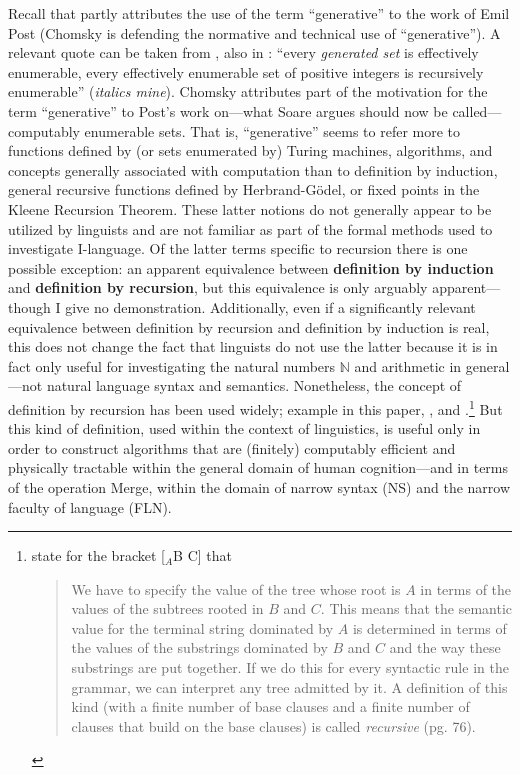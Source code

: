 \documentclass[11pt,twoside]{article}
\theoremstyle{plain}
\numberwithin{equation}{section}
\theoremstyle{definition}
\newtheorem{phrase string}{Phrase String}
\begin{document}
Recall that \cite[9]{chomsky65aspects} partly attributes the use of the term ``generative'' to the work of Emil Post (Chomsky is defending the normative and technical use of ``generative''). A relevant quote can be taken from \cite[286]{post:1944}, also in \cite{soare:2008}: ``every \textsl{generated set} is effectively enumerable, every effectively enumerable set of positive integers is recursively enumerable'' (\textsl{italics mine}). Chomsky attributes part of the motivation for the term ``generative'' to Post's work on---what Soare argues should now be called---computably enumerable sets. That is, ``generative'' seems to refer more to functions defined by (or sets enumerated by) Turing machines, algorithms, and concepts generally associated with computation than to definition by induction, general recursive functions defined by Herbrand-G\"odel, or fixed points in the Kleene Recursion Theorem. These latter notions do not generally appear to be utilized by linguists and are not familiar as part of the formal methods used to investigate I-language. Of the latter terms specific to recursion there is one possible exception: an apparent equivalence between \textbf{definition by induction} and \textbf{definition by recursion}, but this equivalence is only arguably apparent---though I give no demonstration. Additionally, even if a significantly relevant equivalence between definition by recursion and definition by induction is real, this does not change the fact that linguists do not use the latter because it is in fact only useful for investigating the natural numbers $\mathbb{N}$ and arithmetic in general---not natural language syntax and semantics. Nonetheless, the concept of definition by recursion has been used widely; example  in this paper, \cite{pmw:1990}, and \cite{chmg:2000}.\footnote{\cite{chmg:2000} state for the bracket [$_{A}$B C] that \begin{quotation} We have to specify the value of the tree whose root is $A$ in terms of the values of the subtrees rooted in $B$ and $C$. This means that the semantic value for the terminal string dominated by $A$ is determined in terms of the values of the substrings dominated by $B$ and $C$ and the way these substrings are put together. If we do this for every syntactic rule in the grammar, we can interpret any tree admitted by it. A definition of this kind (with a finite number of base clauses and a finite number of clauses that build on the base clauses) is called \textsl{recursive} (pg. 76). \end{quotation}} But this kind of definition, used within the context of linguistics, is useful only in order to construct algorithms that are (finitely) computably efficient and physically tractable within the general domain of human cognition---and in terms of the operation Merge, within the domain of narrow syntax (NS) and the narrow faculty of language (FLN).
\end{document}

